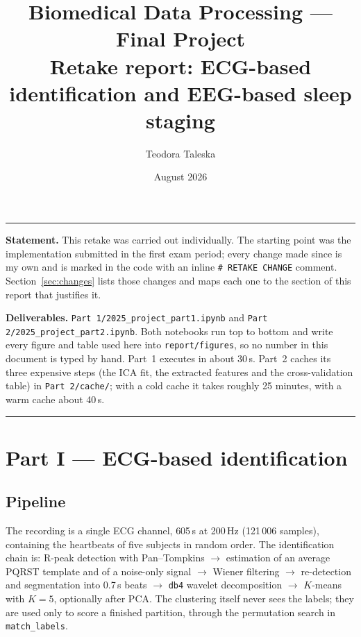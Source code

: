 \documentclass[11pt,a4paper]{article}
\title{\vspace{-1.5cm}\textbf{Biomedical Data Processing --- Final Project}\\[2pt]
       \large Retake report: ECG-based identification and EEG-based sleep staging}
\author{Teodora Taleska}
\date{August 2026}
\newcommand{\hertz}{Hz}
\newcommand{\second}{s}
\newcommand{\num}[1]{#1}
\newcommand{\SI}[2]{#1\,#2}
\begin{document}
\maketitle
\vspace{-0.8cm}

\noindent\rule{\textwidth}{0.4pt}
\smallskip

\noindent\textbf{Statement.} This retake was carried out individually. The starting point was
the implementation submitted in the first exam period; every change made since is my own and
is marked in the code with an inline \texttt{\# RETAKE CHANGE} comment. Section~\ref{sec:changes}
lists those changes and maps each one to the section of this report that justifies it.

\smallskip
\noindent\textbf{Deliverables.} \texttt{Part 1/2025\_project\_part1.ipynb} and
\texttt{Part 2/2025\_project\_part2.ipynb}. Both notebooks run top to bottom and write every
figure and table used here into \texttt{report/figures}, so no number in this document is
typed by hand. Part~1 executes in about 30\,s. Part~2 caches its three expensive steps (the
ICA fit, the extracted features and the cross-validation table) in \texttt{Part 2/cache/};
with a cold cache it takes roughly 25 minutes, with a warm cache about 40\,s.

\noindent\rule{\textwidth}{0.4pt}

\section{Part I --- ECG-based identification}

\subsection{Pipeline}

The recording is a single ECG channel, \SI{605}{\second} at \SI{200}{\hertz}
(\num{121\,006} samples), containing the heartbeats of five subjects in random order. The
identification chain is: R-peak detection with Pan--Tompkins $\rightarrow$ estimation of an
average PQRST template and of a noise-only signal $\rightarrow$ Wiener filtering
$\rightarrow$ re-detection and segmentation into \SI{0.7}{\second} beats $\rightarrow$
\texttt{db4} wavelet decomposition $\rightarrow$ $K$-means with $K=5$, optionally after PCA.
The clustering itself never sees the labels; they are used only to score a finished
partition, through the permutation search in \texttt{match\_labels}.
\end{document}
